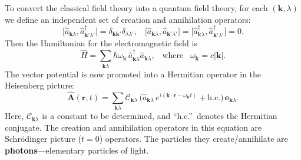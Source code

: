 \documentclass[prx,12pt]{revtex4-2}
\begin{document}
To convert the classical field theory into a quantum field theory, for
each $(\mathbf{k},\lambda)$ we define an independent set of creation
and annihilation operators:
\begin{equation}
  \big[\hat{a}_{\mathbf{k}\lambda}, \hat{a}_{\mathbf{k}'\lambda'}^\dagger\big]
  = \delta_{\mathbf{k}\mathbf{k}'} \delta_{\lambda\lambda'}, \;\;\;
  \big[\hat{a}_{\mathbf{k}\lambda}, \hat{a}_{\mathbf{k}'\lambda'}\big]
  = \big[\hat{a}_{\mathbf{k}\lambda}^\dagger, \hat{a}_{\mathbf{k}'\lambda'}^\dagger\big]
  = 0.
\end{equation}
Then the Hamiltonian for the electromagnetic field is
\begin{equation}
  \hat{H} = \sum_{\mathbf{k}\lambda} \hbar \omega_{\mathbf{k}} \,
  \hat{a}^\dagger_{\mathbf{k}\lambda} \hat{a}_{\mathbf{k}\lambda},
  \;\;\; \mathrm{where}
  \;\;\;\omega_{\mathbf{k}} = c|\mathbf{k}|.
\end{equation}
The vector potential is now promoted into a Hermitian operator in the
Heisenberg picture:
\begin{equation}
  \hat{\mathbf{A}}(\mathbf{r},t) = \sum_{\mathbf{k}\lambda} 
  \mathcal{C}_{\mathbf{k}\lambda}\,
  \Big(\hat{a}_{\mathbf{k}\lambda} \, e^{i(\mathbf{k}\cdot\mathbf{r} - \omega_{\mathbf{k}} t)}
  + \mathrm{h.c.}\Big)\, \mathbf{e}_{\mathbf{k}\lambda}.
  \label{Aquantum}
\end{equation}
Here, $\mathcal{C}_{\mathbf{k}\lambda}$ is a constant to be
determined, and ``h.c.''~denotes the Hermitian conjugate.  The
creation and annihilation operators in this equation are Schr\"odinger
picture ($t = 0$) operators.  The particles they create/annihilate are
\textbf{photons}---elementary particles of light.
\end{document}
